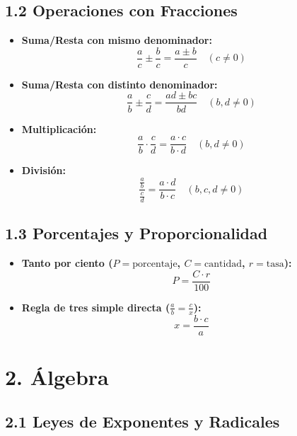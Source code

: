 \documentclass[11pt,a4paper]{article}
\begin{document}
\subsection*{1.2 Operaciones con Fracciones}

\begin{itemize}
  \item \textbf{Suma/Resta con mismo denominador:}
  \[
    \frac{a}{c} \pm \frac{b}{c} = \frac{a \pm b}{c} \quad (c \ne 0)
  \]
  \item \textbf{Suma/Resta con distinto denominador:}
  \[
    \frac{a}{b} \pm \frac{c}{d} = \frac{ad \pm bc}{bd} \quad (b, d \ne 0)
  \]
  \item \textbf{Multiplicación:}
  \[
    \frac{a}{b} \cdot \frac{c}{d} = \frac{a \cdot c}{b \cdot d} \quad (b, d \ne 0)
  \]
  \item \textbf{División:}
  \[
    \frac{\frac{a}{b}}{\frac{c}{d}} = \frac{a \cdot d}{b \cdot c} \quad (b, c, d \ne 0)
  \]
\end{itemize}

\subsection*{1.3 Porcentajes y Proporcionalidad}

\begin{itemize}
  \item \textbf{Tanto por ciento ($P = \text{porcentaje}$, $C = \text{cantidad}$, $r = \text{tasa}$):}
  \[
    P = \frac{C \cdot r}{100}
  \]
  \item \textbf{Regla de tres simple directa ($\frac{a}{b} = \frac{c}{x}$):}
  \[
    x = \frac{b \cdot c}{a}
  \]
\end{itemize}

\section*{2. Álgebra}

\subsection*{2.1 Leyes de Exponentes y Radicales}
\end{document}
